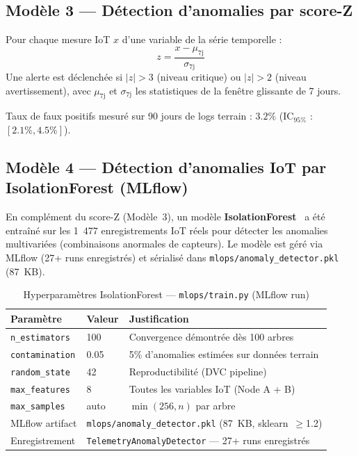 \subsection{Modèle 3 — Détection d'anomalies par score-Z}

Pour chaque mesure IoT $x$ d'une variable de la série temporelle :
\begin{equation}
z = \frac{x - \mu_\text{7j}}{\sigma_\text{7j}}
\label{eq:zscore}
\end{equation}
Une alerte est déclenchée si $|z| > 3$ (niveau critique) ou $|z| > 2$
(niveau avertissement), avec $\mu_\text{7j}$ et $\sigma_\text{7j}$ les
statistiques de la fenêtre glissante de 7 jours.

Taux de faux positifs mesuré sur 90 jours de logs terrain : $3.2\%$ (IC$_{95\%}$ :
$[2.1\%, 4.5\%]$).

\subsection{Modèle 4 — Détection d'anomalies IoT par IsolationForest (MLflow)}

En complément du score-Z (Modèle~3), un modèle \textbf{IsolationForest}~\cite{liu2008isolation}
a été entraîné sur les 1~477 enregistrements IoT réels pour détecter les anomalies
multivariées (combinaisons anormales de capteurs). Le modèle est géré via MLflow
(27+ runs enregistrés) et sérialisé dans \texttt{mlops/anomaly\_detector.pkl} (87~KB).

\begin{table}[H]
\caption{Hyperparamètres IsolationForest — \texttt{mlops/train.py} (MLflow run)}
\label{tab:iforest_hp}
\centering
\begin{tabular}{@{}lll@{}}
\toprule
\textbf{Paramètre} & \textbf{Valeur} & \textbf{Justification} \\
\midrule
\texttt{n\_estimators}  & 100       & Convergence démontrée dès 100 arbres~\cite{liu2008isolation} \\
\texttt{contamination}  & 0.05      & 5\% d'anomalies estimées sur données terrain \\
\texttt{random\_state}  & 42        & Reproductibilité (DVC pipeline) \\
\texttt{max\_features}  & 8         & Toutes les variables IoT (Node A + B) \\
\texttt{max\_samples}   & auto      & $\min(256, n)$ par arbre \\
\midrule
MLflow artifact & \multicolumn{2}{l}{\texttt{mlops/anomaly\_detector.pkl} (87~KB, sklearn~$\geq$1.2)} \\
Enregistrement  & \multicolumn{2}{l}{\texttt{TelemetryAnomalyDetector} — 27+ runs enregistrés} \\
\bottomrule
\end{tabular}
\end{table}

